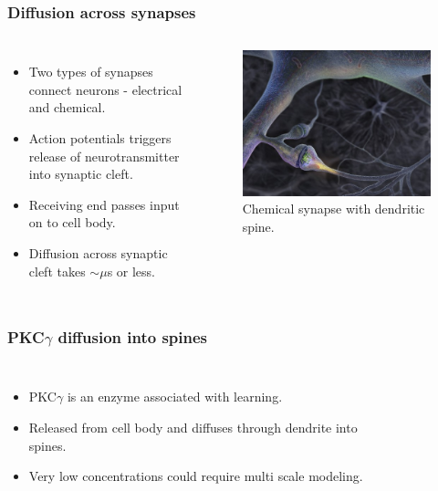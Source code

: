 \begin{frame}
 \frametitle{Diffusion across synapses}
 \begin{columns}
 \begin{itemize}
 \item Two types of synapses connect neurons - electrical and chemical.
 \item Action potentials triggers release of neurotransmitter into synaptic cleft.
 \item Receiving end passes input on to cell body.
 \item Diffusion across synaptic cleft takes $\sim\mu$s or less.
 \end{itemize}
\begin{figure}[H]
 \centering
 \includegraphics[width=\textwidth]{figures/synapse.jpg}
 \caption{Chemical synapse with dendritic spine.}
\end{figure}
 \end{columns} 
\end{frame}

\begin{frame}
 \frametitle{PKC$\gamma$ diffusion into spines}
 \begin{columns}
  \column{2.0in}
  \begin{itemize}
   \item PKC$\gamma$ is an enzyme associated with learning.
   \item Released from cell body and diffuses through dendrite into spines.
   \item Very low concentrations could require multi scale modeling.
  \end{itemize}
\column{2.0in}
\begin{figure}[H]
\centering
\end{figure}

 \end{columns}

\end{frame}
